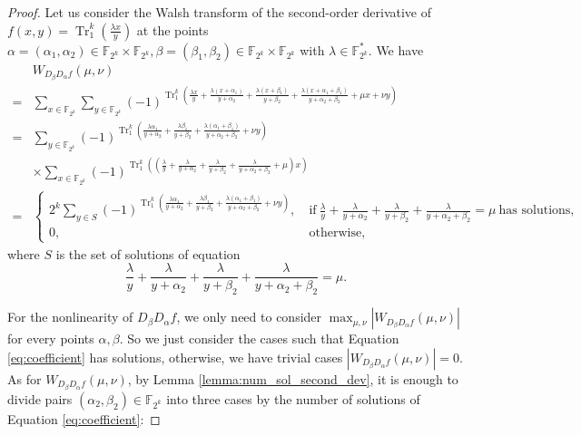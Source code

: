 \documentclass{article}
\newcommand{\F}{\mathbb{F}}
\newcommand{\0}{\textbf{0}}
\newcommand{\1}{\textbf{1}}
\newcommand{\TRACE}{\operatorname{Tr}_1^k}
\theoremstyle{plain}
\begin{document}
    \begin{proof}
        Let us consider the Walsh transform of the second-order derivative of $f(x,y)=\TRACE\left(\frac{\lambda x}{y}\right)$ at the points $\alpha=(\alpha_1,\alpha_2)\in\F_{2^k}\times\F_{2^k},\beta=(\beta_1,\beta_2)\in\F_{2^k}\times\F_{2^k}$ with $\lambda\in\F_{2^k}^*$.
        We have
        \begin{align*}\label{eq:secondordersum}
            &W_{D_{\beta}D_{\alpha}f}(\mu,\nu)\nonumber\\
            =&\sum_{x\in\F_{2^k}}\sum_{y\in\F_{2^k}}(-1)^{\TRACE\left(\frac{\lambda x}{y}+\frac{\lambda (x+\alpha_1)}{y+\alpha_2}+\frac{\lambda (x+\beta_1)}{y+\beta_2}+\frac{\lambda (x+\alpha_1+\beta_1)}{y+\alpha_2+\beta_2}+\mu x+\nu y\right)}\nonumber\\
            =&\sum_{y\in\F_{2^k}}(-1)^{\TRACE\left(\frac{\lambda\alpha_1}{y+\alpha_2}+\frac{\lambda\beta_1}{y+\beta_2}+\frac{\lambda(\alpha_1+\beta_1)}{y+\alpha_2+\beta_2}+\nu y\right)}\nonumber\\
            &\times \sum_{x\in\F_{2^k}}(-1)^{\TRACE\left(\left(\frac{\lambda}{y}+\frac{\lambda}{y+\alpha_2}+\frac{\lambda}{y+\beta_2}+\frac{\lambda}{y+\alpha_2+\beta_2}+\mu\right)x\right)}\nonumber\\
            =&\begin{cases}
                2^k\sum_{y\in S}(-1)^{\TRACE\left(\frac{\lambda\alpha_1}{y+\alpha_2}+\frac{\lambda\beta_1}{y+\beta_2}+\frac{\lambda(\alpha_1+\beta_1)}{y+\alpha_2+\beta_2}+\nu y\right)},&~\text{if}~\frac{\lambda}{y}+\frac{\lambda}{y+\alpha_2}+\frac{\lambda}{y+\beta_2}+\frac{\lambda}{y+\alpha_2+\beta_2}=\mu~\text{has solutions},\\
                0, &~\text{otherwise},
            \end{cases}
        \end{align*}
        where $S$ is the set of solutions of equation
        \begin{equation}\label{eq:coefficient}
            \frac{\lambda}{y}+\frac{\lambda}{y+\alpha_2}+\frac{\lambda}{y+\beta_2}+\frac{\lambda}{y+\alpha_2+\beta_2}=\mu.
        \end{equation}

        For the nonlinearity of $D_{\beta}D_{\alpha}f$, we only need to consider $\max_{\mu,\nu}|W_{D_{\beta}D_{\alpha}f}(\mu,\nu)|$ for every points $\alpha,\beta$.
        So we just consider the cases such that Equation \eqref{eq:coefficient} has solutions, otherwise, we have trivial cases $\left\lvert W_{D_{\beta}D_{\alpha}f}(\mu,\nu)\right\rvert=0$.
        As for $W_{D_{\beta}D_{\alpha}f}(\mu,\nu)$, by Lemma \ref{lemma:num_sol_second_dev}, it is enough to divide pairs $(\alpha_2,\beta_2)\in\F_{2^k}$ into three cases by the number of solutions
        of Equation \eqref{eq:coefficient}:


\end{proof}
\end{document}
